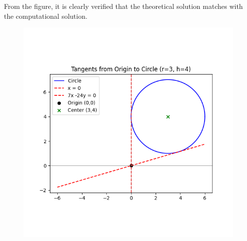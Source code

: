 \documentclass[journal]{IEEEtran}
\begin{document}
From the figure, it is clearly verified that the theoretical solution matches with the computational solution.\\

\begin{figure}[H]
    \centering
    \includegraphics[width=0.6\columnwidth]{figs/Figure_1.png}
    \label{fig:1}
\end{figure}
\end{document}
